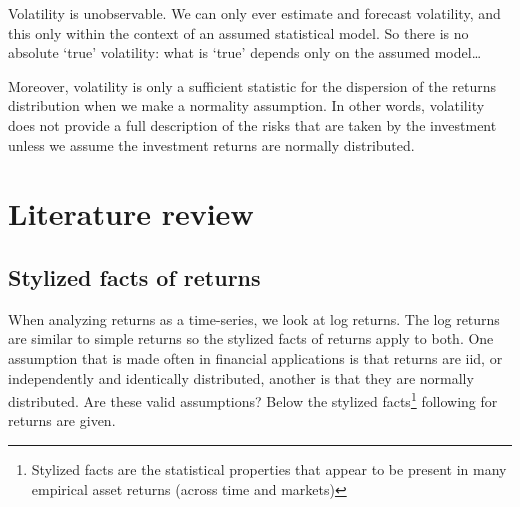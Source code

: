\documentclass[a4paper, twoside]{templates/ociamthesis}
\begin{document}
\begin{savequote}
Volatility is unobservable. We can only ever estimate and forecast
volatility, and this only within the context of an assumed statistical
model. So there is no absolute `true' volatility: what is `true' depends
only on the assumed model\ldots{}

Moreover, volatility is only a sufficient statistic for the dispersion
of the returns distribution when we make a normality assumption. In
other words, volatility does not provide a full description of the risks
that are taken by the investment unless we assume the investment returns
are normally distributed.
\end{savequote}



\hypertarget{lit-rev}{%
\chapter{Literature review}\label{lit-rev}}

\minitoc 

\hypertarget{styl-facts}{%
\section{Stylized facts of returns}\label{styl-facts}}

\noindent When analyzing returns as a time-series, we look at log returns. The log returns are similar to simple returns so the stylized facts of returns apply to both. One assumption that is made often in financial applications is that returns are iid, or independently and identically distributed, another is that they are normally distributed. Are these valid assumptions? Below the stylized facts\footnote{Stylized facts are the statistical properties that appear to be present in many empirical asset returns (across time and markets)} following \textcite{annaert2021} for returns are given.
\end{document}
